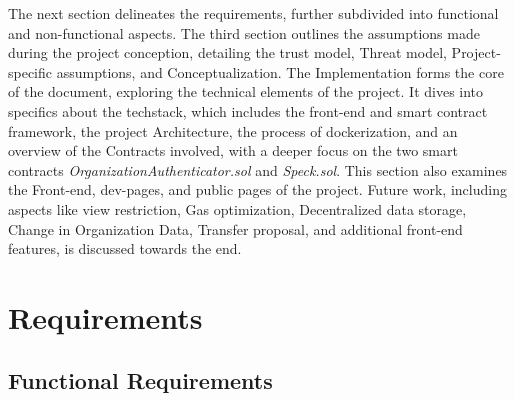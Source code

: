 \documentclass[oneside,a4paper,12pt, colorinlistoftodos]{article} %
\begin{document}
The next section delineates the requirements, further subdivided into functional and non-functional aspects. The third section outlines the assumptions made during the project conception, detailing the trust model, Threat model, Project-specific assumptions, and Conceptualization. The Implementation forms the core of the document, exploring the technical elements of the project. It dives into specifics about the techstack, which includes the front-end and smart contract framework, the project Architecture, the process of dockerization, and an overview of the Contracts involved, with a deeper focus on the two smart contracts \textit{OrganizationAuthenticator.sol} and \textit{Speck.sol}. This section also examines the Front-end, dev-pages, and public pages of the project. Future work, including aspects like view restriction, Gas optimization, Decentralized data storage, Change in Organization Data, Transfer proposal, and additional front-end features, is discussed towards the end.

\section{Requirements}
\subsection{Functional Requirements}
\end{document}
